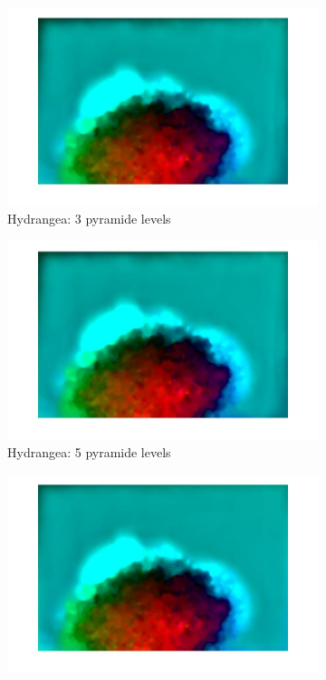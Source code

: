 \documentclass[10pt,twocolumn,letterpaper]{article}
\begin{document}
\begin{figure}
	\centering
	\begin{subfigure}[b]{0.3\textwidth}
		\includegraphics[width=\textwidth] {hydragea_3levels.jpg}
		\caption{Hydrangea: 3 pyramide levels}
		\label{fig:hydragea3}
	\end{subfigure}\hfill
	\begin{subfigure}[b]{0.3\textwidth}
		\includegraphics[width=\textwidth] {hydragea_5levels.jpg} 
		\caption{Hydrangea: 5 pyramide levels}
		\label{fig:hydrangea5}
	\end{subfigure}\hfill
	\begin{subfigure}[b]{0.3\textwidth}
		\includegraphics[width=\textwidth] {hydragea_6levels.jpg} 

\end{subfigure}
\end{figure}
\end{document}
